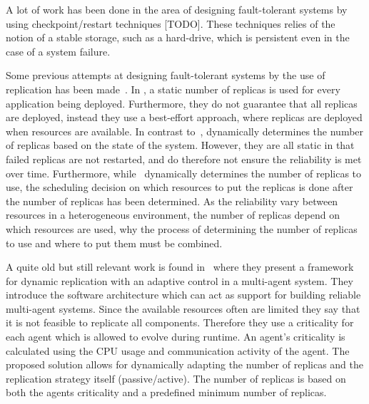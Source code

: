 \documentclass{cslthse-msc}
\begin{document}
A lot of work has been done in the area of designing fault-tolerant systems by using checkpoint/restart techniques [TODO]. %
These techniques relies of the notion of a stable storage, such as a hard-drive, which is persistent even in the case of a system failure.

Some previous attempts at designing fault-tolerant systems by the use of replication has been made~\cite{designFaultTolerantSched, evalReplicationSched, taskSchedulingReplication, effTaskReplMobGrid, relGridServicePredConstraint}. In \cite{evalReplicationSched}, a static number of replicas is used for every application being deployed. Furthermore, they do not guarantee that all replicas are deployed, instead they use a best-effort approach, where replicas are deployed when resources are available. In contrast to~\cite{evalReplicationSched}, \cite{ effTaskReplMobGrid, taskSchedulingReplication, designFaultTolerantSched} dynamically determines the number of replicas based on the state of the system. However, they are all static in that failed replicas are not restarted, and do therefore not ensure the reliability is met over time. Furthermore, while~\cite{designFaultTolerantSched} dynamically determines the number of replicas to use, the scheduling decision on which resources to put the replicas is done after the number of replicas has been determined. As the reliability vary between resources in a heterogeneous environment, the number of replicas depend on which resources are used, why the process of determining the number of replicas to use and where to put them must be combined.

A quite old but still relevant work is found in~\cite{dynAdaptRepl} where they present a framework for dynamic replication with an adaptive control in a multi-agent system. They introduce the software architecture which can act as support for building reliable multi-agent systems. Since the available resources often are limited they say that it is not feasible to replicate all components. Therefore they use a criticality for each agent which is allowed to evolve during runtime. An agent's criticality is calculated using the CPU usage and communication activity of the agent. The proposed solution allows for dynamically adapting the number of replicas and the replication strategy itself (passive/active). The number of replicas is based on both the agents criticality and a predefined minimum number of replicas. %
\end{document}
